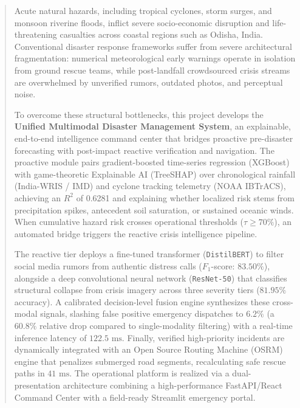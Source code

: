 \documentclass{article}
\begin{document}
\clearpage
\begin{abstract}
Acute natural hazards, including tropical cyclones, storm surges, and monsoon riverine floods, inflict severe socio-economic disruption and life-threatening casualties across coastal regions such as Odisha, India. Conventional disaster response frameworks suffer from severe architectural fragmentation: numerical meteorological early warnings operate in isolation from ground rescue teams, while post-landfall crowdsourced crisis streams are overwhelmed by unverified rumors, outdated photos, and perceptual noise. 

To overcome these structural bottlenecks, this project develops the \textbf{Unified Multimodal Disaster Management System}, an explainable, end-to-end intelligence command center that bridges proactive pre-disaster forecasting with post-impact reactive verification and navigation. The proactive module pairs gradient-boosted time-series regression (XGBoost) with game-theoretic Explainable AI (TreeSHAP) over chronological rainfall (India-WRIS / IMD) and cyclone tracking telemetry (NOAA IBTrACS), achieving an $R^2$ of 0.6281 and explaining whether localized risk stems from precipitation spikes, antecedent soil saturation, or sustained oceanic winds. When cumulative hazard risk crosses operational thresholds ($\tau \ge 70\%$), an automated bridge triggers the reactive crisis intelligence pipeline. 

The reactive tier deploys a fine-tuned transformer (\texttt{DistilBERT}) to filter social media rumors from authentic distress calls ($F_1$-score: $83.50\%$), alongside a deep convolutional neural network (\texttt{ResNet-50}) that classifies structural collapse from crisis imagery across three severity tiers ($81.95\%$ accuracy). A calibrated decision-level fusion engine synthesizes these cross-modal signals, slashing false positive emergency dispatches to $6.2\%$ (a $60.8\%$ relative drop compared to single-modality filtering) with a real-time inference latency of $122.5\text{ ms}$. Finally, verified high-priority incidents are dynamically integrated with an Open Source Routing Machine (OSRM) engine that penalizes submerged road segments, recalculating safe rescue paths in $41\text{ ms}$. The operational platform is realized via a dual-presentation architecture combining a high-performance FastAPI/React Command Center with a field-ready Streamlit emergency portal.
\end{abstract}
\end{document}
